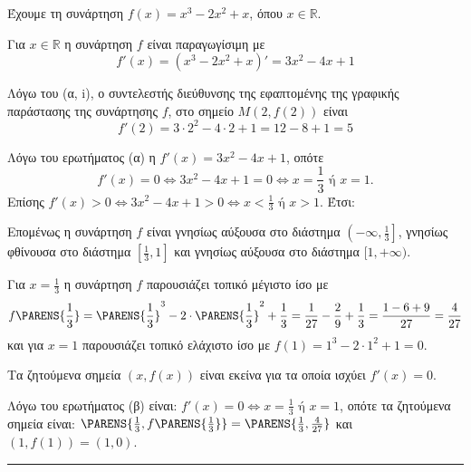 
Έχουμε τη συνάρτηση $f(x) = x^3 - 2x^2 + x$, όπου $x \in \mathbb{R}$.
\begin{alist}
\item
    \begin{rlist}
        \item Για $x \in \mathbb{R}$ η συνάρτηση $f$ είναι παραγωγίσιμη με
        \[ f'(x) = (x^3 - 2x^2 + x)' = 3x^2 - 4x + 1 \]
        \item Λόγω του (α, i), ο συντελεστής διεύθυνσης της εφαπτομένης της γραφικής παράστασης της συνάρτησης $f$, στο σημείο $M(2, f(2))$ είναι
        \[ f'(2) = 3 \cdot 2^2 - 4 \cdot 2 + 1 = 12 - 8 + 1 = 5 \]
    \end{rlist}
\item Λόγω του ερωτήματος (α) η $f'(x) = 3x^2 - 4x + 1$, οπότε
\[ f'(x) = 0 \Leftrightarrow 3x^2 - 4x + 1 = 0 \Leftrightarrow x = \frac{1}{3} \text{ ή } x = 1. \]
Επίσης $f'(x) > 0 \Leftrightarrow 3x^2 - 4x + 1 > 0 \Leftrightarrow x < \frac{1}{3} \text{ ή } x > 1$. Έτσι:
\begin{center}
\end{center}

Επομένως η συνάρτηση $f$ είναι γνησίως αύξουσα στο διάστημα $\left(-\infty, \frac{1}{3}\right]$, γνησίως φθίνουσα στο διάστημα $\left[\frac{1}{3}, 1\right]$ και γνησίως αύξουσα στο διάστημα $[1, +\infty)$.

Για $x = \frac{1}{3}$ η συνάρτηση $f$ παρουσιάζει τοπικό μέγιστο ίσο με
\[ f\PARENS{\frac{1}{3}} = \PARENS{\frac{1}{3}}^3 - 2 \cdot \PARENS{\frac{1}{3}}^2 + \frac{1}{3} = \frac{1}{27} - \frac{2}{9} + \frac{1}{3} = \frac{1-6+9}{27} = \frac{4}{27} \]
και για $x = 1$ παρουσιάζει τοπικό ελάχιστο ίσο με $f(1) = 1^3 - 2 \cdot 1^2 + 1 = 0$.

\item Τα ζητούμενα σημεία $(x, f(x))$ είναι εκείνα για τα οποία ισχύει $f'(x) = 0$.

Λόγω του ερωτήματος (β) είναι: $f'(x) = 0 \Leftrightarrow x = \frac{1}{3} \text{ ή } x = 1$, οπότε τα ζητούμενα σημεία είναι: $\PARENS{\frac{1}{3}, f\PARENS{\frac{1}{3}}} = \PARENS{\frac{1}{3}, \frac{4}{27}}$ και $(1, f(1)) = (1, 0)$.
\end{alist}
\vspace{6mm}
\noindent\rule{\textwidth}{0.4pt}
\vspace{6mm}

